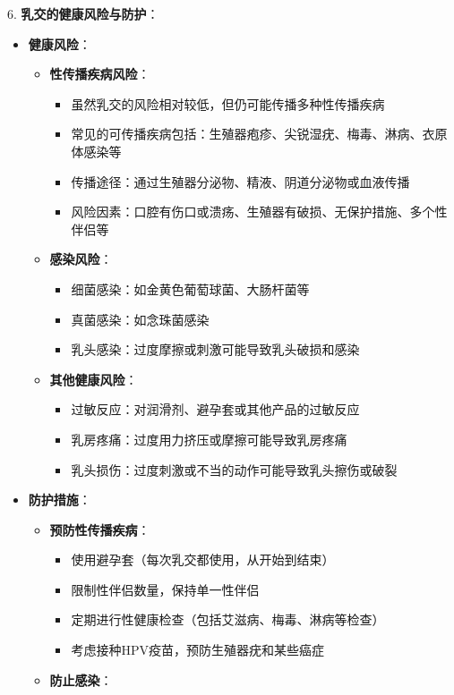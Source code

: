 \documentclass[12pt,UTF8]{ctexbook}
\begin{document}
6. \textbf{乳交的健康风险与防护}：
\begin{itemize}
	\item \textbf{健康风险}：
	\begin{itemize}
		\item \textbf{性传播疾病风险}：
		\begin{itemize}
			\item 虽然乳交的风险相对较低，但仍可能传播多种性传播疾病
			\item 常见的可传播疾病包括：生殖器疱疹、尖锐湿疣、梅毒、淋病、衣原体感染等
			\item 传播途径：通过生殖器分泌物、精液、阴道分泌物或血液传播
			\item 风险因素：口腔有伤口或溃疡、生殖器有破损、无保护措施、多个性伴侣等
		\end{itemize}
		\item \textbf{感染风险}：
		\begin{itemize}
			\item 细菌感染：如金黄色葡萄球菌、大肠杆菌等
			\item 真菌感染：如念珠菌感染
			\item 乳头感染：过度摩擦或刺激可能导致乳头破损和感染
		\end{itemize}
		\item \textbf{其他健康风险}：
		\begin{itemize}
			\item 过敏反应：对润滑剂、避孕套或其他产品的过敏反应
			\item 乳房疼痛：过度用力挤压或摩擦可能导致乳房疼痛
			\item 乳头损伤：过度刺激或不当的动作可能导致乳头擦伤或破裂
		\end{itemize}
	\end{itemize}
	\item \textbf{防护措施}：
	\begin{itemize}
		\item \textbf{预防性传播疾病}：
		\begin{itemize}
			\item 使用避孕套（每次乳交都使用，从开始到结束）
			\item 限制性伴侣数量，保持单一性伴侣
			\item 定期进行性健康检查（包括艾滋病、梅毒、淋病等检查）
			\item 考虑接种HPV疫苗，预防生殖器疣和某些癌症
		\end{itemize}
		\item \textbf{防止感染}：
		\begin{itemize}

\end{itemize}
\end{itemize}
\end{itemize}
\end{document}

